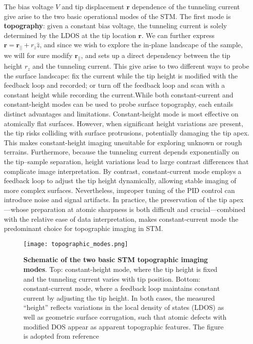 \noindent The bias voltage $V$ and tip displacement $\mathbf{r}$ dependence of the tunneling current give arise to the two basic operational modes of the \ac{STM}. The first mode is \textbf{topography}: given a constant bias voltage, the tunneling current is solely determined by the \ac{LDOS} at the tip location $\mathbf{r}$. We can further express $\mathbf{r} = \mathbf{r_{||}} + r_z \hat{z}$, and since we wish to explore the in-plane landscape of the sample, we will for sure modify $\mathbf{r_{||}}$, and sets up a direct dependency between the tip height $r_z$ and the tunneling current. This give arise to two different ways to probe the surface landscape: fix the current while the tip height is modified with the feedback loop and recorded; or turn off the feedback loop and scan with a constant height while recording the current.While both constant-current and constant-height modes can be used to probe surface topography, each entails distinct advantages and limitations. Constant-height mode is most effective on atomically flat surfaces. However, when significant height variations are present, the tip risks colliding with surface protrusions, potentially damaging the tip apex. This makes constant-height imaging unsuitable for exploring unknown or rough terrains. Furthermore, because the tunneling current depends exponentially on the tip–sample separation, height variations lead to large contrast differences that complicate image interpretation. By contrast, constant-current mode employs a feedback loop to adjust the tip height dynamically, allowing stable imaging of more complex surfaces. Nevertheless, improper tuning of the PID control can introduce noise and signal artifacts. In practice, the preservation of the tip apex—whose preparation at atomic sharpness is both difficult and crucial—combined with the relative ease of data interpretation, makes constant-current mode the predominant choice for topographic imaging in STM. 

\begin{figure}
	\centering
	\texttt{[image: topographic\_modes.png]}
	\caption[\textbf{Schematic of the two basic STM topographic imaging modes}]{\textbf{Schematic of the two basic STM topographic imaging modes}. Top: constant-height mode, where the tip height is fixed and the tunneling current varies with tip position. Bottom: constant-current mode, where a feedback loop maintains constant current by adjusting the tip height. In both cases, the measured “height” reflects variations in the local density of states (LDOS) as well as geometric surface corrugation, such that atomic defects with modified DOS appear as apparent topographic features. The figure is adopted from reference \cite{stuartScanningTunnellingMicroscopy2021}}
	\label{fig:topo_modes}
\end{figure}

